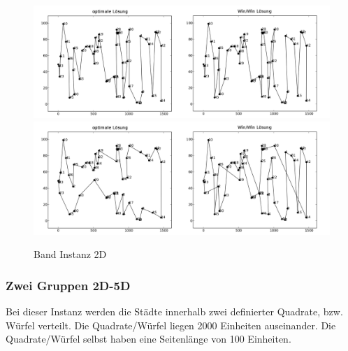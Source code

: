\documentclass[11pt,a4paper]{article}
\begin{document}
\begin{figure}[H]
    \centering
    \includegraphics[width=16cm]{gfx/belt_hpp_comparison}
    \includegraphics[width=16cm]{gfx/belt_tsp_comparison}
    \caption{Band Instanz 2D}
    \label{img:belt_comparison}
\end{figure}

\subsubsection{Zwei Gruppen 2D-5D}
Bei dieser Instanz werden die Städte innerhalb zwei definierter Quadrate, bzw. Würfel verteilt. Die Quadrate/Würfel liegen 2000 Einheiten auseinander. Die Quadrate/Würfel selbst haben eine Seitenlänge von 100 Einheiten.
\end{document}
